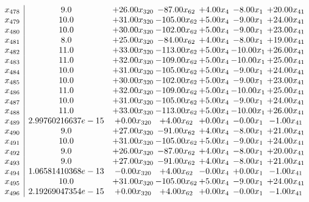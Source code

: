 \documentclass[8pt]{article}
\begin{document}
\[\begin{array}{c| c c@{\hskip 2pt} c@{\hskip 2pt} c@{\hskip 2pt} c@{\hskip 2pt} c@{\hskip 2pt} }
 x_{478}   &  9.0 & + 26.00 x_{320} & -87.00 x_{62} & +  4.00 x_{4} & -8.00 x_{1} & + 20.00 x_{41}\\
 x_{479}   &  10.0 & + 31.00 x_{320} & -105.00 x_{62} & +  5.00 x_{4} & -9.00 x_{1} & + 24.00 x_{41}\\
 x_{480}   &  10.0 & + 30.00 x_{320} & -102.00 x_{62} & +  5.00 x_{4} & -9.00 x_{1} & + 23.00 x_{41}\\
 x_{481}   &  8.0 & + 25.00 x_{320} & -84.00 x_{62} & +  4.00 x_{4} & -8.00 x_{1} & + 19.00 x_{41}\\
 x_{482}   &  11.0 & + 33.00 x_{320} & -113.00 x_{62} & +  5.00 x_{4} & -10.00 x_{1} & + 26.00 x_{41}\\
 x_{483}   &  11.0 & + 32.00 x_{320} & -109.00 x_{62} & +  5.00 x_{4} & -10.00 x_{1} & + 25.00 x_{41}\\
 x_{484}   &  10.0 & + 31.00 x_{320} & -105.00 x_{62} & +  5.00 x_{4} & -9.00 x_{1} & + 24.00 x_{41}\\
 x_{485}   &  10.0 & + 30.00 x_{320} & -102.00 x_{62} & +  5.00 x_{4} & -9.00 x_{1} & + 23.00 x_{41}\\
 x_{486}   &  11.0 & + 32.00 x_{320} & -109.00 x_{62} & +  5.00 x_{4} & -10.00 x_{1} & + 25.00 x_{41}\\
 x_{487}   &  10.0 & + 31.00 x_{320} & -105.00 x_{62} & +  5.00 x_{4} & -9.00 x_{1} & + 24.00 x_{41}\\
 x_{488}   &  11.0 & + 33.00 x_{320} & -113.00 x_{62} & +  5.00 x_{4} & -10.00 x_{1} & + 26.00 x_{41}\\
 x_{489}   &  2.99760216637e-15 & +  0.00 x_{320} & +  4.00 x_{62} & +  0.00 x_{4} & -0.00 x_{1} & -1.00 x_{41}\\
 x_{490}   &  9.0 & + 27.00 x_{320} & -91.00 x_{62} & +  4.00 x_{4} & -8.00 x_{1} & + 21.00 x_{41}\\
 x_{491}   &  10.0 & + 31.00 x_{320} & -105.00 x_{62} & +  5.00 x_{4} & -9.00 x_{1} & + 24.00 x_{41}\\
 x_{492}   &  9.0 & + 26.00 x_{320} & -87.00 x_{62} & +  4.00 x_{4} & -8.00 x_{1} & + 20.00 x_{41}\\
 x_{493}   &  9.0 & + 27.00 x_{320} & -91.00 x_{62} & +  4.00 x_{4} & -8.00 x_{1} & + 21.00 x_{41}\\
 x_{494}   &  1.06581410368e-13 & -0.00 x_{320} & +  4.00 x_{62} & -0.00 x_{4} & +  0.00 x_{1} & -1.00 x_{41}\\
 x_{495}   &  10.0 & + 31.00 x_{320} & -105.00 x_{62} & +  5.00 x_{4} & -9.00 x_{1} & + 24.00 x_{41}\\
 x_{496}   &  2.19269047354e-15 & +  0.00 x_{320} & +  4.00 x_{62} & +  0.00 x_{4} & -0.00 x_{1} & -1.00 x_{41}\\

\end{array}\]
\end{document}
